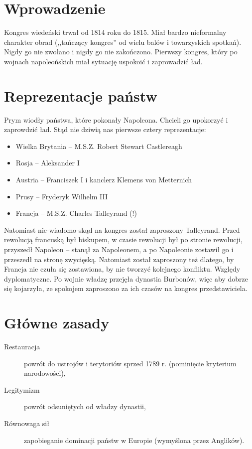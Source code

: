 \documentclass [a4paper, 11pt, oneside]{book}
\begin{document}
    \section{Wprowadzenie} %
    \label{sec:wprowadzenie}
        Kongres wiedeński trwał od 1814 roku do 1815. Miał bardzo nieformalny charakter obrad (,,tańczący kongres'' od wielu balów i towarzyskich spotkań). Nigdy go nie zwołano i nigdy go nie zakończono. Pierwszy kongres, który po wojnach napoleońskich miał sytuację uspokoić i zaprowadzić ład.
    \section{Reprezentacje państw} %
    \label{sec:reprezentacje_pa_stw}
        Prym wiodły państwa, które pokonały Napoleona. Chcieli go upokorzyć i zaprowdzić ład. Stąd nie dziwią nas pierwsze cztery reprezentacje:
        \begin{itemize}
            \item Wielka Brytania -- M.S.Z. Robert Stewart Castlereagh
            \item Rosja -- Aleksander I
            \item Austria -- Franciszek I i kanclerz Klemens von Metternich
            \item Prusy -- Fryderyk Wilhelm III
            \item Francja -- M.S.Z. Charles Talleyrand (!)
        \end{itemize}
        Natomiast nie-wiadomo-skąd na kongres został zaproszony Talleyrand. Przed rewolucją francuską był biskupem, w czasie rewolucji był po stronie rewolucji, przyszedł Napoleon -- stanął za Napoleonem, a po Napoleonie zostawił go i przeszedł na stronę zwycięską. Natomiast został zaproszony też dlatego, by Francja nie czuła się zostawiona, by nie tworzyć kolejnego konfliktu. Względy dyplomatyczne. Po wojnie władzę przejęła dynastia Burbonów, więc aby dobrze się kojarzyła, ze spokojem zaproszono za ich czasów na kongres przedstawiciela.
    \section{Główne zasady} %
    \label{sec:g_wne_zasady}
        \begin{description}
            \item[Restauracja] powrót do ustrojów i terytoriów sprzed 1789 r. (pominięcie kryterium narodowości),
            \item[Legitymizm] powrót odsuniętych od władzy dynastii,
            \item[Równowaga sił] zapobieganie dominacji państw w Europie (wymyślona przez Anglików).
        \end{description}
\end{document}
